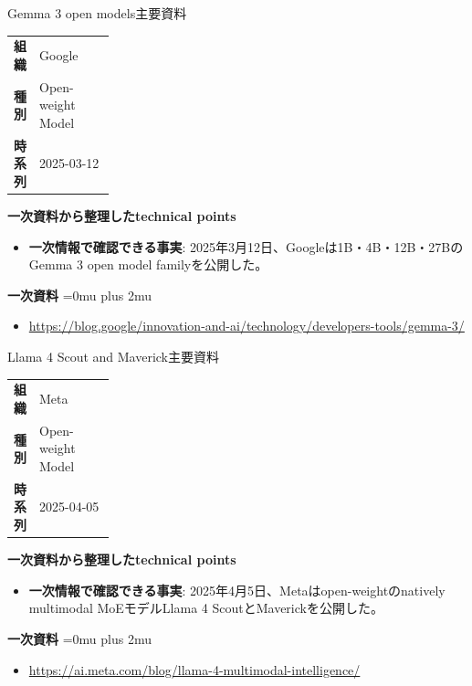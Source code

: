 \begin{technicalnote}{Gemma 3 open models}{主要資料}
\begingroup
\begin{tabularx}{\linewidth}{@{}>{\bfseries}p{0.22\linewidth}X@{}}
組織 & Google \\
種別 & Open-weight Model \\
時系列 & 2025-03-12 \\
\end{tabularx}
\smallskip
{\bfseries 一次資料から整理したtechnical points}
\begin{itemize}[leftmargin=1.5em,itemsep=0.35em]
\item \textbf{一次情報で確認できる事実}: 2025年3月12日、Googleは1B・4B・12B・27BのGemma 3 open model familyを公開した。
\end{itemize}
\begin{samepage}
{\bfseries 一次資料}
\begingroup\sloppy
\Urlmuskip=0mu plus 2mu\relax
\begin{itemize}[leftmargin=1.5em,itemsep=0.25em]
\item {\scriptsize\url{https://blog.google/innovation-and-ai/technology/developers-tools/gemma-3/}}
\end{itemize}
\endgroup
\end{samepage}
\endgroup
\end{technicalnote}
\medskip

\begin{technicalnote}{Llama 4 Scout and Maverick}{主要資料}
\begingroup
\begin{tabularx}{\linewidth}{@{}>{\bfseries}p{0.22\linewidth}X@{}}
組織 & Meta \\
種別 & Open-weight Model \\
時系列 & 2025-04-05 \\
\end{tabularx}
\smallskip
{\bfseries 一次資料から整理したtechnical points}
\begin{itemize}[leftmargin=1.5em,itemsep=0.35em]
\item \textbf{一次情報で確認できる事実}: 2025年4月5日、Metaはopen-weightのnatively multimodal MoEモデルLlama 4 ScoutとMaverickを公開した。
\end{itemize}
\begin{samepage}
{\bfseries 一次資料}
\begingroup\sloppy
\Urlmuskip=0mu plus 2mu\relax
\begin{itemize}[leftmargin=1.5em,itemsep=0.25em]
\item {\scriptsize\url{https://ai.meta.com/blog/llama-4-multimodal-intelligence/}}
\end{itemize}
\endgroup
\end{samepage}
\endgroup
\end{technicalnote}
\medskip

